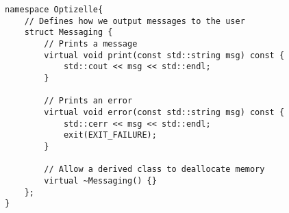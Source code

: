 \begin{lstlisting}[style=C++]
namespace Optizelle{
    // Defines how we output messages to the user
    struct Messaging {
        // Prints a message
        virtual void print(const std::string msg) const {
            std::cout << msg << std::endl;
        }

        // Prints an error
        virtual void error(const std::string msg) const {
            std::cerr << msg << std::endl;
            exit(EXIT_FAILURE);
        }

        // Allow a derived class to deallocate memory
        virtual ~Messaging() {}
    };
}
\end{lstlisting}
